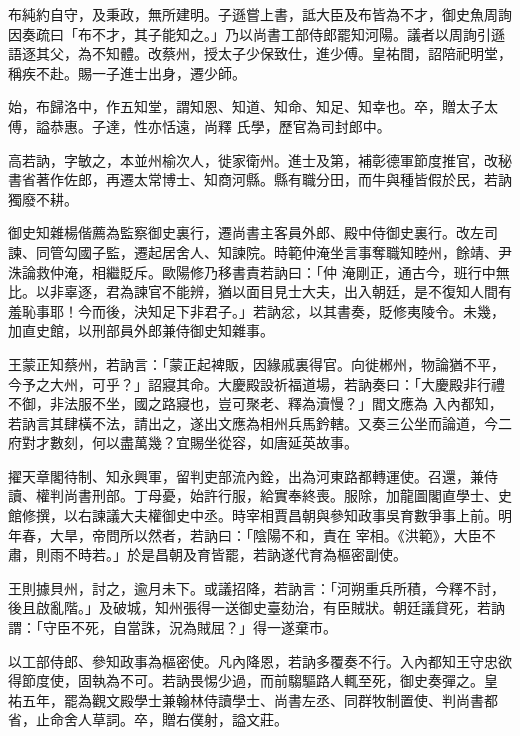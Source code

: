 \begin{pinyinscope}
 布純約自守，及秉政，無所建明。子遜嘗上書，詆大臣及布皆為不才，御史魚周詢因奏疏曰「布不才，其子能知之。」乃以尚書工部侍郎罷知河陽。議者以周詢引遜語逐其父，為不知體。改蔡州，授太子少保致仕，進少傅。皇祐間，詔陪祀明堂，稱疾不赴。賜一子進士出身，遷少師。



 始，布歸洛中，作五知堂，謂知恩、知道、知命、知足、知幸也。卒，贈太子太傅，謚恭惠。子達，性亦恬遠，尚釋
 氏學，歷官為司封郎中。



 高若訥，字敏之，本並州榆次人，徙家衛州。進士及第，補彰德軍節度推官，改秘書省著作佐郎，再遷太常博士、知商河縣。縣有職分田，而牛與種皆假於民，若訥獨廢不耕。



 御史知雜楊偕薦為監察御史裏行，遷尚書主客員外郎、殿中侍御史裏行。改左司諫、同管勾國子監，遷起居舍人、知諫院。時範仲淹坐言事奪職知睦州，餘靖、尹洙論救仲淹，相繼貶斥。歐陽修乃移書責若訥曰：「仲
 淹剛正，通古今，班行中無比。以非辜逐，君為諫官不能辨，猶以面目見士大夫，出入朝廷，是不復知人間有羞恥事耶！今而後，決知足下非君子。」若訥忿，以其書奏，貶修夷陵令。未幾，加直史館，以刑部員外郎兼侍御史知雜事。



 王蒙正知蔡州，若訥言：「蒙正起裨販，因緣戚裏得官。向徙郴州，物論猶不平，今予之大州，可乎？」詔寢其命。大慶殿設祈福道場，若訥奏曰：「大慶殿非行禮不御，非法服不坐，國之路寢也，豈可聚老、釋為瀆慢？」閻文應為
 入內都知，若訥言其肆橫不法，請出之，遂出文應為相州兵馬鈐轄。又奏三公坐而論道，今二府對才數刻，何以盡萬幾？宜賜坐從容，如唐延英故事。



 擢天章閣待制、知永興軍，留判吏部流內銓，出為河東路都轉運使。召還，兼侍讀、權判尚書刑部。丁母憂，始許行服，給實奉終喪。服除，加龍圖閣直學士、史館修撰，以右諫議大夫權御史中丞。時宰相賈昌朝與參知政事吳育數爭事上前。明年春，大旱，帝問所以然者，若訥曰：「陰陽不和，責在
 宰相。《洪範》，大臣不肅，則雨不時若。」於是昌朝及育皆罷，若訥遂代育為樞密副使。



 王則據貝州，討之，逾月未下。或議招降，若訥言：「河朔重兵所積，今釋不討，後且啟亂階。」及破城，知州張得一送御史臺劾治，有臣賊狀。朝廷議貸死，若訥謂：「守臣不死，自當誅，況為賊屈？」得一遂棄市。



 以工部侍郎、參知政事為樞密使。凡內降恩，若訥多覆奏不行。入內都知王守忠欲得節度使，固執為不可。若訥畏惕少過，而前騶驅路人輒至死，御史奏彈之。皇
 祐五年，罷為觀文殿學士兼翰林侍讀學士、尚書左丞、同群牧制置使、判尚書都省，止命舍人草詞。卒，贈右僕射，謚文莊。




\end{pinyinscope}
